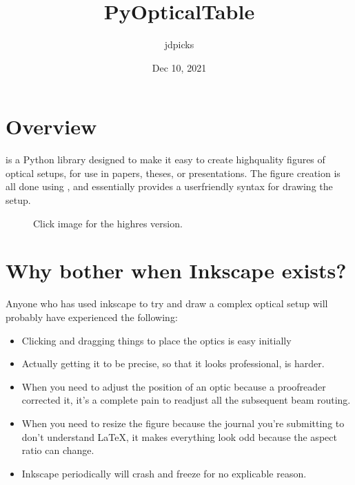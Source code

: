 \documentclass[letterpaper,10pt,english]{sphinxmanual}
\title{PyOpticalTable}
\date{Dec 10, 2021}
\author{jdpicks}
\let\sphinxpxdimen\pdfpxdimen\else\newdimen\sphinxpxdimen
\begin{document}
\pagestyle{empty}
\sphinxmaketitle
\pagestyle{plain}
\sphinxtableofcontents
\pagestyle{normal}
\label{\detokenize{index::doc}}



\chapter{Overview}
\label{\detokenize{index:overview}}
\sphinxAtStartPar
{} is a Python library designed to make it easy to create high\sphinxhyphen{}quality figures of optical setups, for use in papers, theses, or presentations. The figure creation is all done using , and  essentially provides a user\sphinxhyphen{}friendly syntax for drawing the setup.

\begin{figure}[htbp]
\centering
\capstart

\noindent\sphinxincludegraphics[width=800\sphinxpxdimen]{{complex_example}.png}
\caption{Click image for the high\sphinxhyphen{}res version.}\label{\detokenize{index:id1}}\end{figure}


\chapter{Why bother when Inkscape exists?}
\label{\detokenize{index:why-bother-when-inkscape-exists}}
\sphinxAtStartPar
Anyone who has used inkscape to try and draw a complex optical setup will probably have experienced the following:
\begin{itemize}
\item {} 
\sphinxAtStartPar
Clicking and dragging things to place the optics is easy initially

\item {} 
\sphinxAtStartPar
Actually getting it to be precise, so that it looks professional, is harder.

\item {} 
\sphinxAtStartPar
When you need to adjust the position of an optic because a proof\sphinxhyphen{}reader corrected it, it’s a complete pain to readjust all the subsequent beam routing.

\item {} 
\sphinxAtStartPar
When you need to resize the figure because the journal you’re submitting to don’t understand LaTeX, it makes everything look odd because the aspect ratio can change.

\item {} 
\sphinxAtStartPar
Inkscape periodically will crash and freeze for no explicable reason.

\end{itemize}
\end{document}
